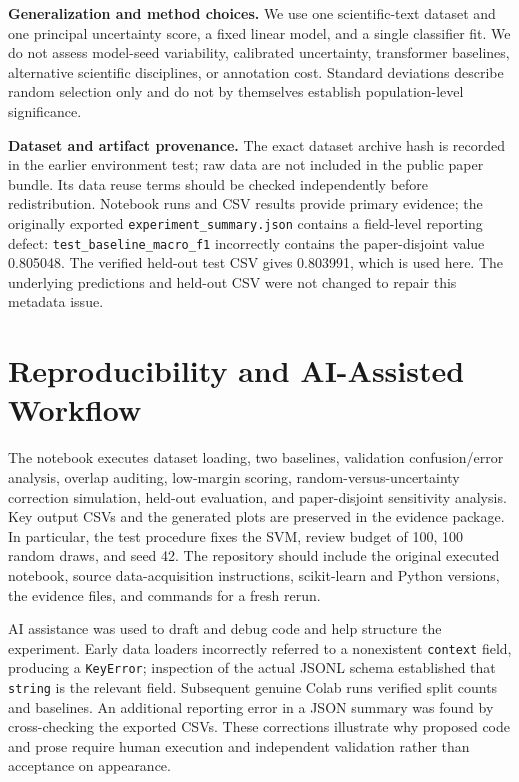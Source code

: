 \documentclass[11pt]{article}
\begin{document}
\textbf{Generalization and method choices.} We use one scientific-text dataset and one principal uncertainty score, a fixed linear model, and a single classifier fit. We do not assess model-seed variability, calibrated uncertainty, transformer baselines, alternative scientific disciplines, or annotation cost. Standard deviations describe random selection only and do not by themselves establish population-level significance.

\textbf{Dataset and artifact provenance.} The exact dataset archive hash is recorded in the earlier environment test; raw data are not included in the public paper bundle. Its data reuse terms should be checked independently before redistribution. Notebook runs and CSV results provide primary evidence; the originally exported \texttt{experiment\_summary.json} contains a field-level reporting defect: \texttt{test\_baseline\_macro\_f1} incorrectly contains the paper-disjoint value 0.805048. The verified held-out test CSV gives 0.803991, which is used here. The underlying predictions and held-out CSV were not changed to repair this metadata issue.

\section{Reproducibility and AI-Assisted Workflow}
The notebook executes dataset loading, two baselines, validation confusion/error analysis, overlap auditing, low-margin scoring, random-versus-uncertainty correction simulation, held-out evaluation, and paper-disjoint sensitivity analysis. Key output CSVs and the generated plots are preserved in the evidence package. In particular, the test procedure fixes the SVM, review budget of 100, 100 random draws, and seed 42. The repository should include the original executed notebook, source data-acquisition instructions, scikit-learn and Python versions, the evidence files, and commands for a fresh rerun.

AI assistance was used to draft and debug code and help structure the experiment. Early data loaders incorrectly referred to a nonexistent \texttt{context} field, producing a \texttt{KeyError}; inspection of the actual JSONL schema established that \texttt{string} is the relevant field. Subsequent genuine Colab runs verified split counts and baselines. An additional reporting error in a JSON summary was found by cross-checking the exported CSVs. These corrections illustrate why proposed code and prose require human execution and independent validation rather than acceptance on appearance.
\end{document}
